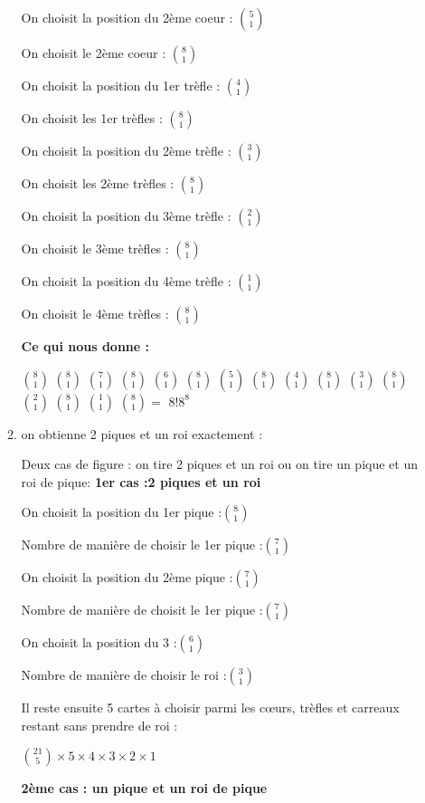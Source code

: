 \documentclass[a4paper,10pt]{article}
\begin{document}
\begin{enumerate}
\begin{enumerate}
		On choisit la position du 2ème coeur :
		$\binom{5}{1}$
		
		On choisit le 2ème coeur :
		$\binom{8}{1}$
		
		On choisit la position du 1er trèfle :
		$\binom{4}{1}$
		
		On choisit les 1er trèfles :		
		$\binom{8}{1}$
		
		On choisit la position du 2ème trèfle :
		$\binom{3}{1}$
		
		On choisit les 2ème trèfles :		
		$\binom{8}{1}$
		
		On choisit la position du 3ème trèfle :
		$\binom{2}{1}$
		
		On choisit le 3ème trèfles :		
		$\binom{8}{1}$
		
		On choisit la position du 4ème trèfle :
		$\binom{1}{1}$
		
		On choisit le 4ème trèfles :		
		$\binom{8}{1}$
		
		\textbf{Ce qui nous donne :}
		
		$\binom{8}{1}$
		$\binom{8}{1}$
		$\binom{7}{1}$
		$\binom{8}{1}$
		$\binom{6}{1}$
		$\binom{8}{1}$
		$\binom{5}{1}$
		$\binom{8}{1}$
		$\binom{4}{1}$
		$\binom{8}{1}$
		$\binom{3}{1}$
		$\binom{8}{1}$
		$\binom{2}{1}$
		$\binom{8}{1}$
		$\binom{1}{1}$
		$\binom{8}{1}=$
		$8!8^8$
		
		\item on obtienne 2 piques et un roi exactement :
		
		Deux cas de figure : on tire 2 piques et un roi ou on tire un pique et un roi de pique:
		\textbf{1er cas :2 piques et un roi}
		
		On choisit la position du 1er pique :$\binom{8}{1}$
		
		Nombre de manière de choisir le 1er pique :$\binom{7}{1}$
		
		On choisit la position du 2ème pique :$\binom{7}{1}$
		
		Nombre de manière de choisit le 1er pique :$\binom{7}{1}$
		
		On choisit la position du 3 :$\binom{6}{1}$
		
		Nombre de manière de choisir le roi :$\binom{3}{1}$
		
		Il reste ensuite 5 cartes à choisir parmi les cœurs, trèfles et carreaux restant 				sans prendre de roi :
		
		$\binom{21}{5}\times5\times 4\times 3 \times 2\times1$
		
		\textbf{2ème cas : un pique et un roi de pique}
		

\end{enumerate}
\end{enumerate}
\end{document}
